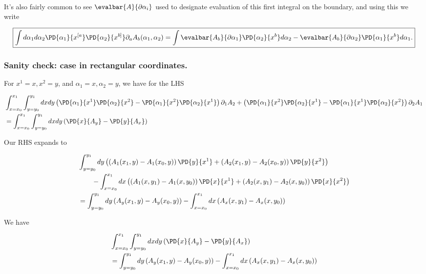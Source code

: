 It's also fairly common to see $\evalbar{A}{\partial \alpha_i}$ used to designate evaluation of this first integral on the boundary, and using this we write

\begin{equation}\label{eqn:stokesTensor:470}
\boxed{
\int
d{\alpha_1} d{\alpha_2}
\PD{\alpha_1}{x^{[a}}
\PD{\alpha_2}{x^{b]}}
\partial_a A_{b}(\alpha_1, \alpha_2)
=
\int
\evalbar{A_b}{\partial \alpha_1}
\PD{\alpha_2}{x^{b}} d{\alpha_2}
-
\evalbar{A_b}{\partial \alpha_2}
\PD{\alpha_1}{x^{b}} d{\alpha_1}.
}
\end{equation}

\subsubsection{Sanity check:  case in rectangular coordinates.}

For $x^1 = x, x^2 = y$, and $\alpha_1 = x, \alpha_2 = y$, we have for the LHS

\begin{align*}
&\int_{x=x_0}^{x_1}
\int_{y=y_0}^{y_1}
dx dy
\left(
\PD{\alpha_1}{x^{1}}
\PD{\alpha_2}{x^{2}}
-\PD{\alpha_1}{x^{2}}
\PD{\alpha_2}{x^{1}}
\right)
\partial_1 A_{2}
+
\left(
\PD{\alpha_1}{x^{2}}
\PD{\alpha_2}{x^{1}}
-\PD{\alpha_1}{x^{1}}
\PD{\alpha_2}{x^{2}}
\right)
\partial_2 A_{1} \\
&=
\int_{x=x_0}^{x_1}
\int_{y=y_0}^{y_1}
dx dy
\left( \PD{x}{A_y} - \PD{y}{A_x} \right)
\end{align*}

Our RHS expands to

\begin{align*}
&\int_{y=y_0}^{y_1} dy
\left(
\left( A_1(x_1, y) - A_1(x_0, y) \right)
\PD{y}{x^{1}}
+
\left( A_2(x_1, y) - A_2(x_0, y) \right)
\PD{y}{x^{2}}
\right) \\
&\qquad-
\int_{x=x_0}^{x_1} dx
\left(
\left( A_1(x, y_1) - A_1(x, y_0) \right)
\PD{x}{x^{1}}
+
\left( A_2(x, y_1) - A_2(x, y_0) \right)
\PD{x}{x^{2}}
\right) \\
&=
\int_{y=y_0}^{y_1} dy
\left( A_y(x_1, y) - A_y(x_0, y) \right)
-
\int_{x=x_0}^{x_1} dx
\left( A_x(x, y_1) - A_x(x, y_0) \right)
\end{align*}

We have

\begin{equation}\label{eqn:stokesTensor:490}
\begin{aligned}
&\int_{x=x_0}^{x_1}
\int_{y=y_0}^{y_1}
dx dy
\left( \PD{x}{A_y} - \PD{y}{A_x} \right) \\
&=
\int_{y=y_0}^{y_1} dy
\left( A_y(x_1, y) - A_y(x_0, y) \right)
-
\int_{x=x_0}^{x_1} dx
\left( A_x(x, y_1) - A_x(x, y_0) \right)
\end{aligned}
\end{equation}

